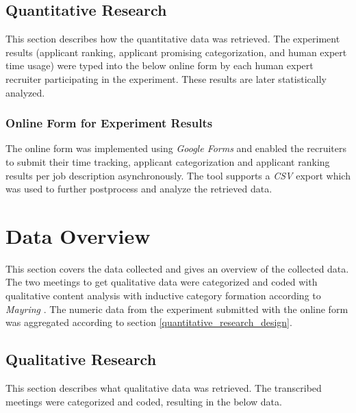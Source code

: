 \documentclass[draft,final]{thesisclass} %
\begin{document}
\subsection{Quantitative Research}
This section describes how the quantitative data was retrieved.
The experiment results (applicant ranking, applicant promising categorization, and human expert time usage) were typed into the below online form by each human expert recruiter participating in the experiment.
These results are later statistically analyzed.

\subsubsection{Online Form for Experiment Results}
The online form was implemented using \textit{Google Forms} and enabled the recruiters to submit their time tracking, applicant categorization and applicant ranking results per job description asynchronously. The tool supports a \textit{CSV} export which was used to further postprocess and analyze the retrieved data.

\section{Data Overview}
This section covers the data collected and gives an overview of the collected data.
The two meetings to get qualitative data were categorized and coded with qualitative content analysis with inductive category formation according to \textit{Mayring} \parencite{mayring}.
The numeric data from the experiment submitted with the online form was aggregated according to section \ref{quantitative_research_design}.

\subsection{Qualitative Research}
This section describes what qualitative data was retrieved.
The transcribed meetings were categorized and coded, resulting in the below data.
\end{document}
